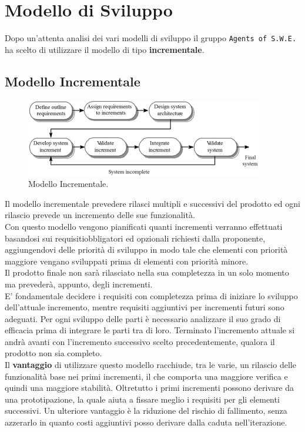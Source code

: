 \section{Modello di Sviluppo}

Dopo un'attenta analisi dei vari modelli di sviluppo il gruppo \texttt{Agents of S.W.E.} ha scelto di utilizzare il modello di tipo \textbf{incrementale}.

\subsection{Modello Incrementale}

\begin{figure}[h]
	\centering
  		\includegraphics[width=0.7\linewidth]{./images/modelloincrementale.png}
  		\caption{Modello Incrementale.}
  		\label{fig:Modello Incrementale}
\end{figure}

Il modello incrementale prevedere rilasci multipli e successivi del prodotto ed ogni rilascio prevede un incremento delle sue funzionalità. \\
Con questo modello vengono pianificati quanti incrementi verranno effettuati basandosi sui requisiti\glossario obbligatori ed opzionali richiesti dalla proponente, aggiungendovi delle priorità di sviluppo in modo tale che elementi con priorità maggiore vengano sviluppati prima di elementi con priorità minore.\\
Il prodotto finale non sarà rilasciato nella sua completezza in un solo momento ma prevederà, appunto, degli incrementi. \\
E' fondamentale decidere i requisiti con completezza prima di iniziare lo sviluppo dell'attuale incremento, mentre requisiti aggiuntivi per incrementi futuri sono adeguati. Per ogni sviluppo delle parti è necessario analizzare il suo grado di efficacia prima di integrare le parti tra di loro. Terminato l'incremento attuale si andrà avanti con l'incremento successivo scelto precedentemente, qualora il prodotto non sia completo. \\
Il \textbf{vantaggio} di utilizzare questo modello racchiude, tra le varie, un rilascio delle funzionalità base nei primi incrementi, il che comporta una maggiore verifica e quindi una maggiore stabilità. Oltretutto i primi incrementi possono derivare da una prototipazione, la quale aiuta a fissare meglio i requisiti per gli elementi successivi. Un ulteriore vantaggio è la riduzione del rischio di fallimento, senza azzerarlo in quanto costi aggiuntivi posso derivare dalla caduta nell'iterazione\glossario.
